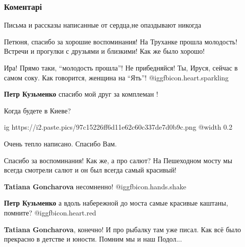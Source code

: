  
 
 
 
 
\subsubsection{Коментарі}

\begin{itemize} %
Письма и рассказы написанные от сердца,не опаздывают никогда

Петюня, спасибо за хорошие воспоминания! На Труханке прошла молодость! Встречи
и прогулки с друзьями и близкими! Как же было хорошо!

\begin{itemize} %
Ира! Прямо таки, \enquote{молодость прошла}! Не прибедняйся! Ты, Ируся, сейчас
в самом соку. Как говорится, женщина на \enquote{Ять}!  @igg{fbicon.heart.sparkling} 

\textbf{Петр Кузьменко} спасибо мой друг за комплеман !

Когда будете в Киеве?
\end{itemize} %


\ifcmt
  ig https://i2.paste.pics/97c15226ff6d11e62c60c337de7d0b9c.png
  @width 0.2
\fi

Очень тепло написано. Спасибо Вам.



Спасибо за воспоминания! Как же, а про салют? На Пешеходном мосту мы всегда
смотрели салют и он был всегда самый красивый!

\begin{itemize} %
\textbf{Tatiana Goncharova} несомненно!  @igg{fbicon.hands.shake} 

\textbf{Петр Кузьменко} а вдоль набережной до моста самые красивые каштаны, помните? @igg{fbicon.heart.red}

\textbf{Tatiana Goncharova}, конечно! И про рыбалку там уже писал. Как всё было прекрасно в детстве и юности. Помним мы и наш Подол...


\end{itemize}
\end{itemize}
